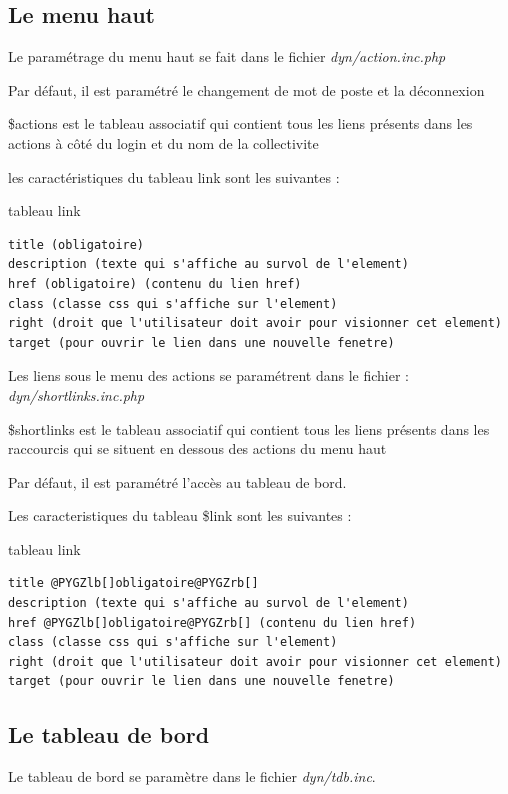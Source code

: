\documentclass[letterpaper,10pt,french]{manual}
\begin{document}
\subsection{Le menu haut}

Le paramétrage du menu haut se fait dans le fichier \emph{dyn/action.inc.php}

Par défaut, il est paramétré le changement de mot de poste et la déconnexion

\$actions est le tableau associatif qui contient tous les liens présents dans
les actions à côté du login et du nom de la collectivite

les caractéristiques du tableau link sont les suivantes :

tableau link

\begin{Verbatim}[commandchars=@\[\]]
title (obligatoire)
description (texte qui s'affiche au survol de l'element)
href (obligatoire) (contenu du lien href)
class (classe css qui s'affiche sur l'element)
right (droit que l'utilisateur doit avoir pour visionner cet element)
target (pour ouvrir le lien dans une nouvelle fenetre)
\end{Verbatim}

Les liens sous le menu des actions se paramétrent dans le fichier : \emph{dyn/shortlinks.inc.php}

\$shortlinks est le tableau associatif qui contient tous les liens présents
dans les raccourcis qui se situent en dessous des actions du menu haut

Par défaut, il est paramétré l'accès au tableau de bord.

Les caracteristiques du tableau \$link sont les suivantes :

tableau link

\begin{Verbatim}[commandchars=@\[\]]
title @PYGZlb[]obligatoire@PYGZrb[]
description (texte qui s'affiche au survol de l'element)
href @PYGZlb[]obligatoire@PYGZrb[] (contenu du lien href)
class (classe css qui s'affiche sur l'element)
right (droit que l'utilisateur doit avoir pour visionner cet element)
target (pour ouvrir le lien dans une nouvelle fenetre)
\end{Verbatim}


\subsection{Le tableau de bord}

Le tableau de bord se paramètre dans le fichier \emph{dyn/tdb.inc}.
\end{document}
